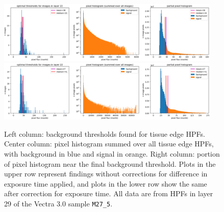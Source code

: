 \documentclass[letterpaper,11pt]{article}
\begin{document}
\begin{figure}[!ht]
\centering
\includegraphics[width=0.95\textwidth]{images/results/thresholding_pre_correction/M27_5_layer_22_background_threshold_plots}
\includegraphics[width=0.95\textwidth]{images/results/thresholding_post_correction/M27_5_layer_22_background_threshold_plots}
\caption{\footnotesize Left column: background thresholds found for tissue edge HPFs. Center column: pixel histogram summed over all tissue edge HPFs, with background in blue and signal in orange. Right column: portion of pixel histogram near the final background threshold. Plots in the upper row represent findings without corrections for difference in exposure time applied, and plots in the lower row show the same after correction for exposure time. All data are from HPFs in layer 29 of the Vectra 3.0 sample \texttt{M27\_5}.}
\label{fig:background_threshold_impact_vectra_layer_22}
\end{figure}
\end{document}
